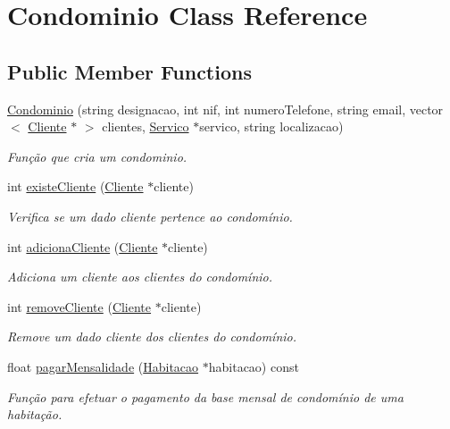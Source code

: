 \hypertarget{class_condominio}{}\section{Condominio Class Reference}
\label{class_condominio}
\subsection*{Public Member Functions}
\begin{DoxyCompactItemize}
\item 
\hyperlink{class_condominio_a69e71aaab401f7ff0a92ff0f45bdb751}{Condominio} (string designacao, int nif, int numero\+Telefone, string email, vector$<$ \hyperlink{class_cliente}{Cliente} $\ast$ $>$ clientes, \hyperlink{class_servico}{Servico} $\ast$servico, string localizacao)
\begin{DoxyCompactList}\small\item\em Função que cria um condominio. \end{DoxyCompactList}\item 
int \hyperlink{class_condominio_a08e2bf58344131ff357f2f7ed62a56fb}{existe\+Cliente} (\hyperlink{class_cliente}{Cliente} $\ast$cliente)
\begin{DoxyCompactList}\small\item\em Verifica se um dado cliente pertence ao condomínio. \end{DoxyCompactList}\item 
int \hyperlink{class_condominio_ae27a8bd9f2e1ad20b18dd34b4bd997d6}{adiciona\+Cliente} (\hyperlink{class_cliente}{Cliente} $\ast$cliente)
\begin{DoxyCompactList}\small\item\em Adiciona um cliente aos clientes do condomínio. \end{DoxyCompactList}\item 
int \hyperlink{class_condominio_ac62185f435dd9c3538a795aa7908beac}{remove\+Cliente} (\hyperlink{class_cliente}{Cliente} $\ast$cliente)
\begin{DoxyCompactList}\small\item\em Remove um dado cliente dos clientes do condomínio. \end{DoxyCompactList}\item 
float \hyperlink{class_condominio_a16747ea7d4e1b442b1985725f5a9aeab}{pagar\+Mensalidade} (\hyperlink{class_habitacao}{Habitacao} $\ast$habitacao) const 
\begin{DoxyCompactList}\small\item\em Função para efetuar o pagamento da base mensal de condomínio de uma habitação. \end{DoxyCompactList}\item 

\end{DoxyCompactItemize}
